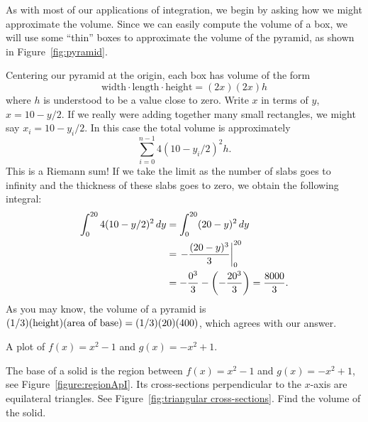 \begin{solution}
As with most of our applications of integration, we begin by asking
how we might approximate the volume. Since we can easily compute the
volume of a box, we will use some ``thin'' boxes to approximate
the volume of the pyramid, as shown in Figure~\ref{fig:pyramid}.

Centering our pyramid at the origin, each box has volume of the form
\[
\text{width}\cdot\text{length}\cdot\text{height} = (2x)(2x)h
\]
where $h$ is understood to be a value close to zero. Write $x$ in
terms of $y$, $x=10-y/2$. If we really were adding together many small
rectangles, we might say $x_i=10-y_i/2$. In this case the total volume
is approximately
\[
\sum_{i=0}^{n-1} 4(10-y_i/2)^2 h.
\]
This is a Riemann sum! If we take the limit as the number of slabs
goes to infinity and the thickness of these slabs goes to zero, we
obtain the following integral:
\begin{align*}
  \int_0^{20} 4(10-y/2)^2\, d y &=\int_0^{20} (20-y)^2\, d y\\
  &=\left.-{(20-y)^3\over3}\right|_0^{20}\\
  &=-{0^3\over3}-\left(-{20^3\over3}\right)={8000\over3}.
\end{align*}
As you may know, the volume of a pyramid is 
$(1/3)(\hbox{height})(\hbox{area of base})=(1/3)(20)(400)$, which
agrees with our answer.
\end{solution}



\begin{marginfigure}[-2.5in]
\caption{A plot of $f(x) = x^2-1$ and $g(x) = -x^2+1$.}
\label{figure:regionApI}
\end{marginfigure}


\begin{example}
The base of a solid is the region between $f(x)=x^2-1$ and
$g(x)=-x^2+1$, see Figure~\ref{figure:regionApI}. Its cross-sections
perpendicular to the $x$-axis are equilateral triangles. See
Figure~\ref{fig:triangular cross-sections}. Find the volume of the
solid.
\end{example}

